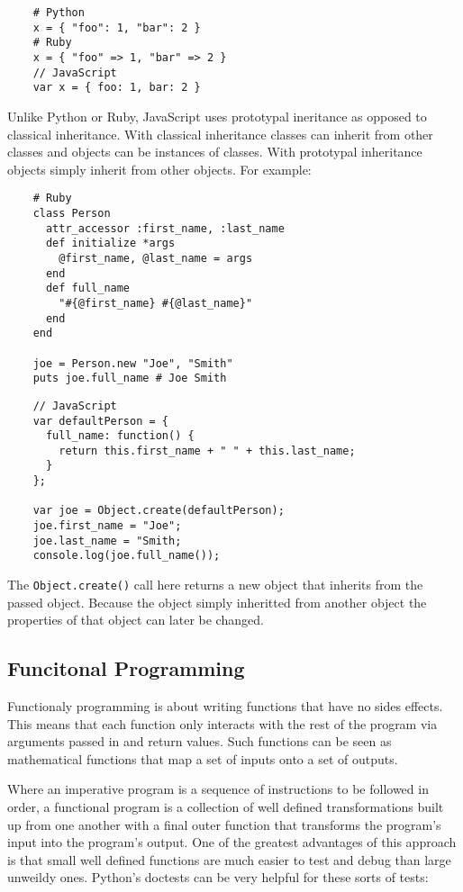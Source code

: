 \documentclass[11pt]{article}
\begin{document}
\begin{verbatim}
    # Python
    x = { "foo": 1, "bar": 2 }
    # Ruby
    x = { "foo" => 1, "bar" => 2 }
    // JavaScript
    var x = { foo: 1, bar: 2 }
\end{verbatim}

   
   Unlike Python or Ruby, JavaScript uses prototypal ineritance as
   opposed to classical inheritance.  With classical inheritance
   classes can inherit from other classes and objects can be instances
   of classes.  With prototypal inheritance objects simply inherit
   from other objects.  For example:
   
\begin{verbatim}
    # Ruby
    class Person
      attr_accessor :first_name, :last_name
      def initialize *args
        @first_name, @last_name = args
      end
      def full_name
        "#{@first_name} #{@last_name}"
      end
    end
    
    joe = Person.new "Joe", "Smith"
    puts joe.full_name # Joe Smith
\end{verbatim}

   
\begin{verbatim}
    // JavaScript
    var defaultPerson = {
      full_name: function() {
        return this.first_name + " " + this.last_name;
      }
    };
    
    var joe = Object.create(defaultPerson);
    joe.first_name = "Joe";
    joe.last_name = "Smith;
    console.log(joe.full_name());
\end{verbatim}

   
   The \verb|Object.create()| call here returns a new object that
   inherits from the passed object.  Because the object simply
   inheritted from another object the properties of that object can
   later be changed.
   
\subsection*{Funcitonal Programming}
\label{sec-1.5}

   Functionaly programming is about writing functions that have no
   sides effects.  This means that each function only interacts with
   the rest of the program via arguments passed in and return values.
   Such functions can be seen as mathematical functions that map a set
   of inputs onto a set of outputs.
   
   Where an imperative program is a sequence of instructions to be
   followed in order, a functional program is a collection of well
   defined transformations built up from one another with a final
   outer function that transforms the program's input into the
   program's output.  One of the greatest advantages of this approach
   is that small well defined functions are much easier to test and
   debug than large unweildy ones.  Python's doctests can be very
   helpful for these sorts of tests:
   
\end{document}

